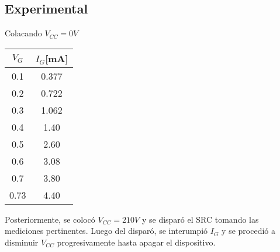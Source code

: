 \subsection{Experimental} %
Colacando $V_{CC}=0V$ 
\par 
\begin{minipage}{0.3\linewidth}
  \centering
  \begin{table}[H]
    \begin{center}
      \begin{tabular}{c|c}
        $V_{G}$ &$I_{G}$[mA]   \\
        \hline
        0.1   &0.377 \\
        0.2   &0.722 \\
        0.3   &1.062 \\
        0.4   &1.40  \\
        0.5   &2.60  \\
        0.6   &3.08  \\
        0.7   &3.80  \\
        0.73  &4.40  \\
      \end{tabular}
    \end{center} 
  \end{table}
\end{minipage}
\begin{minipage}{0.7\linewidth}
  \centering
\end{minipage}
Posteriormente, se colocó $V_{CC}=210V$ y se disparó el SRC tomando las mediciones pertinentes. 
Luego del disparó, se interumpió $I_G$ y se procedió a disminuir $V_{CC}$ progresivamente hasta apagar el dispositivo.
\par
